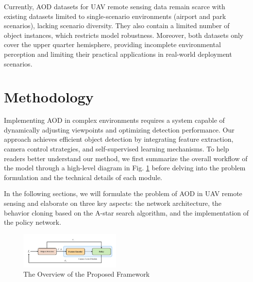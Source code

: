 \documentclass[lettersize,journal]{IEEEtran}
\begin{document}
Currently, AOD datasets for UAV remote sensing data remain scarce with existing datasets limited to single-scenario environments (airport and park scenarios), lacking scenario diversity. They also contain a limited number of object instances, which restricts model robustness. Moreover, both datasets only cover the upper quarter hemisphere, providing incomplete environmental perception and limiting their practical applications in real-world deployment scenarios.










\section{Methodology}
Implementing AOD in complex environments requires a system capable of dynamically adjusting viewpoints and optimizing detection performance. Our approach achieves efficient object detection by integrating feature extraction, camera control strategies, and self-supervised learning mechanisms. To help readers better understand our method, we first summarize the overall workflow of the model through a high-level diagram in Fig. \ref{Overview} before delving into the problem formulation and the technical details of each module.

In the following sections, we will formulate the problem of AOD in UAV remote sensing and elaborate on three key aspects: the network architecture, the behavior cloning based on the A-star search algorithm, and the implementation of the policy network.

\begin{figure}[!t]
    \centering
    \includegraphics[width=0.45\textwidth]{fig/overview.pdf}
    \caption{The Overview of the Proposed Framework}
    \label{Overview}
\end{figure}
\end{document}
